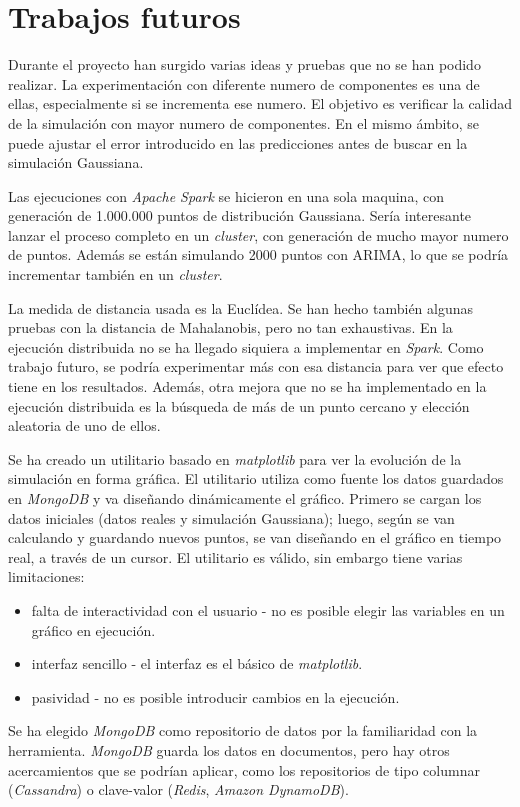\documentclass[11pt,spanish,listoffigures,listoftables]{tfgetsinf}
\begin{document}
\chapter{Trabajos futuros}
Durante el proyecto han surgido varias ideas y pruebas que no se han podido realizar. La experimentación con diferente numero de componentes es una de ellas, especialmente si se incrementa ese numero. El objetivo es verificar la calidad de la simulación con mayor numero de componentes. En el mismo ámbito, se puede ajustar el error introducido en las predicciones antes de buscar en la simulación Gaussiana. 

Las ejecuciones con {\em Apache Spark} se hicieron en una sola maquina, con generación de 1.000.000 puntos de distribución Gaussiana. Sería interesante lanzar el proceso completo en un {\em cluster}, con generación de mucho mayor numero de puntos. Además se están simulando 2000 puntos con ARIMA, lo que se podría incrementar también en un {\em cluster}. 

La medida de distancia usada es la Euclídea. Se han hecho también algunas pruebas con la distancia de Mahalanobis, pero no tan exhaustivas. En la ejecución distribuida no se ha llegado siquiera a implementar en {\em Spark}. Como trabajo futuro, se podría experimentar más con esa distancia para ver que efecto tiene en los resultados. Además, otra mejora que no se ha implementado en la ejecución distribuida es la búsqueda de más de un punto cercano y elección aleatoria de uno de ellos.

Se ha creado un utilitario basado en {\em matplotlib} para ver la evolución de la simulación en forma gráfica. El utilitario utiliza como fuente los datos guardados en {\em MongoDB} y va diseñando dinámicamente el gráfico. Primero se cargan los datos iniciales (datos reales y simulación Gaussiana); luego, según se van calculando y guardando nuevos puntos, se van diseñando en el gráfico en tiempo real, a través de un cursor. El utilitario es válido, sin embargo tiene varias limitaciones: 
\begin{itemize}
\item falta de interactividad con el usuario - no es posible elegir las variables en un gráfico en ejecución.
\item interfaz sencillo - el interfaz es el básico de {\em matplotlib}.
\item pasividad - no es posible introducir cambios en la ejecución.
\end{itemize}

Se ha elegido {\em MongoDB} como repositorio de datos por la familiaridad con la herramienta. {\em MongoDB} guarda los datos en documentos, pero hay otros acercamientos que se podrían aplicar, como los repositorios de tipo columnar ({\em Cassandra}) o clave-valor ({\em Redis}, {\em Amazon DynamoDB}). 
\end{document}
